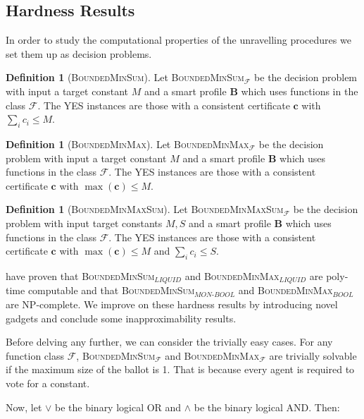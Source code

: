 \documentclass[11pt,a4paper, titlepage]{article}
\theoremstyle{definition}
\newtheorem{definition}[theorem]{Definition}
\let\vec\mathbf
\begin{document}
\subsection{Hardness Results}

In order to study the computational properties of the unravelling procedures we set them up as decision problems.

\begin{definition}[\textsc{BoundedMinSum}]
    Let \textsc{BoundedMinSum}$_\mathcal{F}$ be the decision problem with input a target constant $M$ and a smart profile $\mathbf{B}$ which uses functions in the class $\mathcal{F}$. 
    The YES instances are those with a consistent certificate  $\vec{c}$ with $\sum_i c_i \leq M$. 
\end{definition}

\begin{definition}[\textsc{BoundedMinMax}]
    Let \textsc{BoundedMinMax}$_\mathcal{F}$ be the decision problem with input a target constant $M$ and a smart profile $\mathbf{B}$ which uses functions in the class $\mathcal{F}$. The YES instances are those with a consistent certificate  $\vec{c}$ with $\max(\vec{c}) \leq M$. 
\end{definition}

\begin{definition}[\textsc{BoundedMinMaxSum}]
    Let \textsc{BoundedMinMaxSum}$_\mathcal{F}$ be the decision problem with input target constants $M, S$ and a smart profile $\mathbf{B}$ which uses functions in the class $\mathcal{F}$. The YES instances are those with a consistent certificate  $\vec{c}$ with $\max (\vec{c}) \leq M$ and $\sum_i c_i \leq S$.
\end{definition}


\citeauthor{grandi} have proven that \textsc{BoundedMinSum}$_\mathit{LIQUID}$ and \textsc{BoundedMinMax}$_\mathit{LIQUID}$ are poly-time computable and that \textsc{BoundedMinSum}$_\mathit{MON\text{-}BOOL}$ and \textsc{BoundedMinMax}$_\mathit{BOOL}$ are NP-complete.
We improve on these hardness results by introducing novel gadgets and conclude some inapproximability results.

Before delving any further, we can consider the trivially easy cases. 
For any function class $\mathcal{F}$, \textsc{BoundedMinSum}$_\mathcal{F}$ and \textsc{BoundedMinMax}$_\mathcal{F}$ are trivially solvable if the maximum size of the ballot is 1. That is because every agent is required to vote for a constant.

Now, let $\lor$ be the binary logical OR and $\land$ be the binary logical AND. Then:
\end{document}
